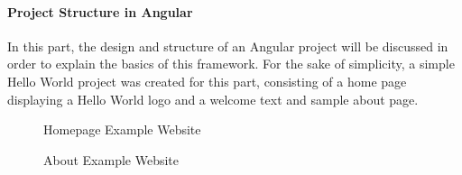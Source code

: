 \paragraph{Project Structure in Angular}
In this part, the design and structure of an Angular project will be discussed in order to explain the basics of this framework. For the sake of simplicity, a simple Hello World project was created for this part, consisting of a home page displaying a Hello World logo and a welcome text and sample about page.
\begin{figure}[h]
	\centering
	\caption{Homepage Example Website}
	\label{fig:examplehomepage}
\end{figure}
\begin{figure}[h]
	\centering
	\caption{About Example Website}
	\label{fig:exampleaboutpage}
\end{figure}
\newpage
